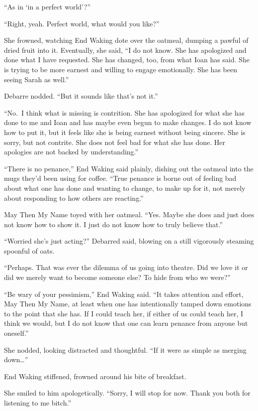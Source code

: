 ``As in `in a perfect world'?''

``Right, yeah. Perfect world, what would you like?''

She frowned, watching End Waking dote over the oatmeal, dumping a pawful of dried fruit into it. Eventually, she said, ``I do not know. She has apologized and done what I have requested. She has changed, too, from what Ioan has said. She is trying to be more earnest and willing to engage emotionally. She has been seeing Sarah as well.''

Debarre nodded. ``But it sounds like that's not it.''

``No.~I think what is missing is contrition. She has apologized for what she has done to me and Ioan and has maybe even begun to make changes. I do not know how to put it, but it feels like she is being earnest without being sincere. She is sorry, but not contrite. She does not feel bad for what she has done. Her apologies are not backed by understanding.''

``There is no penance,'' End Waking said plainly, dishing out the oatmeal into the mugs they'd been using for coffee. ``True penance is borne out of feeling bad about what one has done and wanting to change, to make up for it, not merely about responding to how others are reacting.''

May Then My Name toyed with her oatmeal. ``Yes. Maybe she does and just does not know how to show it. I just do not know how to truly believe that.''

``Worried she's just acting?'' Debarred said, blowing on a still vigorously steaming spoonful of oats.

``Perhaps. That was ever the dilemma of us going into theatre. Did we love it or did we merely want to become someone else? To hide from who we were?''

``Be wary of your pessimism,'' End Waking said. ``It takes attention and effort, May Then My Name, at least when one has intentionally tamped down emotions to the point that she has. If I could teach her, if either of us could teach her, I think we would, but I do not know that one can learn penance from anyone but oneself.''

She nodded, looking distracted and thoughtful. ``If it were as simple as merging down\ldots{}''

End Waking stiffened, frowned around his bite of breakfast.

She smiled to him apologetically. ``Sorry, I will stop for now. Thank you both for listening to me bitch.''


